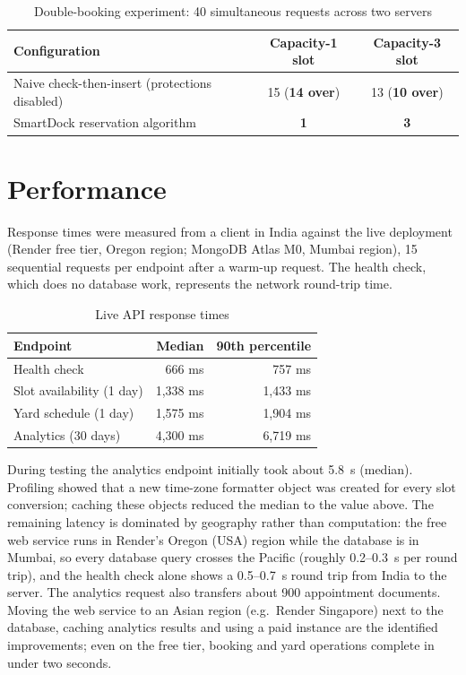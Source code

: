 \begin{table}[H]
\centering
\caption{Double-booking experiment: 40 simultaneous requests across two servers}
\label{tab:conc}
\small
\begin{tabular}{>{\raggedright\arraybackslash}p{5.4cm}cc}
\toprule
\textbf{Configuration} & \textbf{Capacity-1 slot} & \textbf{Capacity-3 slot}\\
\midrule
Naive check-then-insert (protections disabled) & 15 (\textbf{14 over}) & 13 (\textbf{10 over}) \\
SmartDock reservation algorithm & \textbf{1} & \textbf{3} \\
\bottomrule
\end{tabular}
\end{table}

\section{Performance}
Response times were measured from a client in India against the live deployment (Render free tier, Oregon region; MongoDB Atlas M0, Mumbai region), 15 sequential requests per endpoint after a warm-up request. The health check, which does no database work, represents the network round-trip time.

\begin{table}[H]
\centering
\caption{Live API response times}
\label{tab:perf}
\begin{tabular}{lrr}
\toprule
\textbf{Endpoint} & \textbf{Median} & \textbf{90th percentile}\\
\midrule
Health check & 666 ms & 757 ms\\
Slot availability (1 day) & 1,338 ms & 1,433 ms\\
Yard schedule (1 day) & 1,575 ms & 1,904 ms\\
Analytics (30 days) & 4,300 ms & 6,719 ms\\
\bottomrule
\end{tabular}
\end{table}

During testing the analytics endpoint initially took about 5.8~s (median). Profiling showed that a new time-zone formatter object was created for every slot conversion; caching these objects reduced the median to the value above. The remaining latency is dominated by geography rather than computation: the free web service runs in Render's Oregon (USA) region while the database is in Mumbai, so every database query crosses the Pacific (roughly 0.2--0.3~s per round trip), and the health check alone shows a 0.5--0.7~s round trip from India to the server. The analytics request also transfers about 900 appointment documents. Moving the web service to an Asian region (e.g.\ Render Singapore) next to the database, caching analytics results and using a paid instance are the identified improvements; even on the free tier, booking and yard operations complete in under two seconds.

